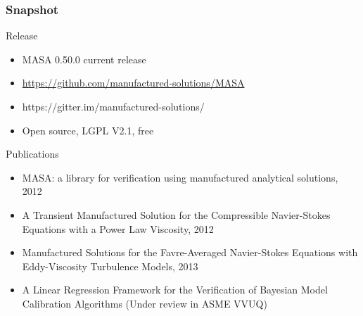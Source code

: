 \documentclass[mathserif]{beamer}
\begin{document}
\begin{frame}
  \frametitle{Snapshot}

  \begin{block}{Release}
    \begin{itemize} 
    \item MASA 0.50.0 current release
    \item \url{https://github.com/manufactured-solutions/MASA}
    \item https://gitter.im/manufactured-solutions/
    \item Open source, LGPL V2.1, free
    \end{itemize}
  \end{block}

  \begin{block}{Publications}
   \begin{itemize}
    \item MASA: a library for verification using manufactured
	  analytical solutions, 2012
    \small
   \item A Transient Manufactured Solution for the Compressible
	 Navier-Stokes Equations with a Power Law Viscosity, 2012
   \item Manufactured Solutions for the Favre-Averaged Navier-Stokes
	 Equations with Eddy-Viscosity Turbulence Models, 2013
   \item A Linear Regression Framework for the Verification of
	 Bayesian Model Calibration Algorithms (Under review in ASME VVUQ)

   \end{itemize}
  \end{block}

\end{frame}
\end{document}
